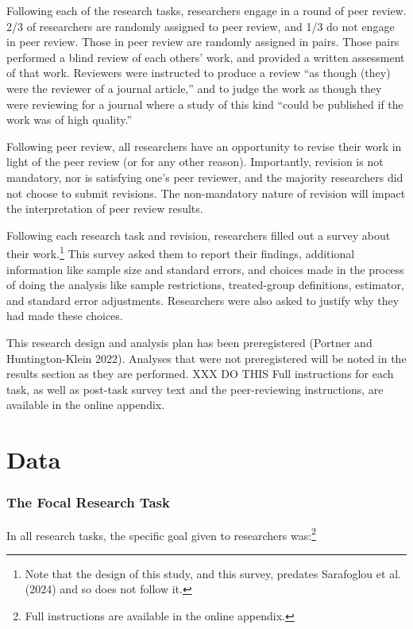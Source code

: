 \documentclass[
  letterpaper,
  DIV=11,
  numbers=noendperiod]{scrartcl}
\begin{document}
Following each of the research tasks, researchers engage in a round of
peer review. 2/3 of researchers are randomly assigned to peer review,
and 1/3 do not engage in peer review. Those in peer review are randomly
assigned in pairs. Those pairs performed a blind review of each others'
work, and provided a written assessment of that work. Reviewers were
instructed to produce a review ``as though (they) were the reviewer of a
journal article,'' and to judge the work as though they were reviewing
for a journal where a study of this kind ``could be published if the
work was of high quality.''

Following peer review, all researchers have an opportunity to revise
their work in light of the peer review (or for any other reason).
Importantly, revision is not mandatory, nor is satisfying one's peer
reviewer, and the majority researchers did not choose to submit
revisions. The non-mandatory nature of revision will impact the
interpretation of peer review results.

Following each research task and revision, researchers filled out a
survey about their work.\footnote{Note that the design of this study,
  and this survey, predates Sarafoglou et al. (2024) and so does not
  follow it.} This survey asked them to report their findings,
additional information like sample size and standard errors, and choices
made in the process of doing the analysis like sample restrictions,
treated-group definitions, estimator, and standard error adjustments.
Researchers were also asked to justify why they had made these choices.

This research design and analysis plan has been preregistered (Portner
and Huntington-Klein 2022). Analyses that were not preregistered will be
noted in the results section as they are performed. XXX DO THIS Full
instructions for each task, as well as post-task survey text and the
peer-reviewing instructions, are available in the online appendix.

\hypertarget{data}{%
\section{Data}\label{data}}

\hypertarget{sec-focaltask}{%
\subsubsection{The Focal Research Task}\label{sec-focaltask}}

In all research tasks, the specific goal given to researchers
was:\footnote{Full instructions are available in the online appendix.}
\end{document}

